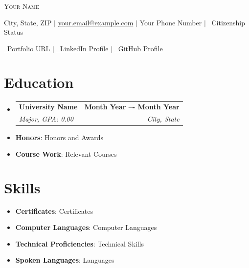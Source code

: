 \documentclass[11pt, letterpaper]{article} %
\makeatletter
\newcommand{\resumeSubheading}[4]{
  \vspace{0pt}\item %
    \begin{tabular*}{0.99\textwidth}[t]{l@{\extracolsep{\fill}}r}
      \textbf{#1} & \textbf{#2} \\ %
      \textit{\small #3} & \textit{\small #4} \\ %
    \end{tabular*}\vspace{-5pt}
}
\newcommand{\resumeListStart}{
  \begin{itemize}[leftmargin=0.05in, label={}] 
}
\newcommand{\resumeListEnd}{
  \end{itemize} \vspace{-5pt} 
}
\newcommand{\resumeItem}[1]{
  \item\small{#1 \vspace{-5pt}} 
}
\makeatother
\begin{document}
\begin{center}
    {\Huge \scshape Your Name} \vspace{5pt} %

    \faMapMarker \hspace{1pt} City, State, ZIP $|$ \hspace{1pt} 
    \faEnvelope \hspace{1pt} \href{mailto:your.email@example.com}{your.email@example.com} $|$ \hspace{1pt} 
    \faPhone \hspace{1pt} Your Phone Number $|$ \hspace{1pt} 
    \faPassport\ Citizenship Status
    
    \vspace{1pt}

    \href{PORTFOLIO HYPERLINK}{\faBriefcase\ Portfolio URL} $|$ \hspace{1pt}
    \href{LinkedIn URL}{\faLinkedin\ {LinkedIn Profile}} $|$ \hspace{1pt}
    \href{GitHub URL}{\faGithub\ {GitHub Profile}} 
\end{center}

\section{Education}
    \resumeListStart
        \resumeSubheading{University Name}{Month Year –- Month Year}{Major, GPA: 0.00}{City, State}
        \resumeItem{\textbf{Honors}{: Honors and Awards}}
        \resumeItem{\textbf{Course Work}{: Relevant Courses}}
    \resumeListEnd

\section{Skills}
\resumeListStart
    \resumeItem{\textbf{Certificates}: Certificates}
    \resumeItem{\textbf{Computer Languages}: Computer Languages}
    \resumeItem{\textbf{Technical Proficiencies}: Technical Skills}
    \resumeItem{\textbf{Spoken Languages}: Languages}
\resumeListEnd

\end{document}
